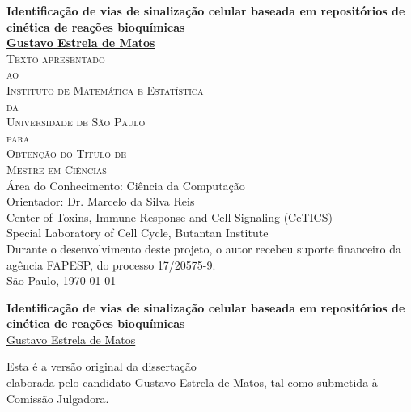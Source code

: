 \documentclass[12pt, twoside]{report}
\numberwithin{mydefinition}{section}
\numberwithin{mytheorem}{section}
\numberwithin{mylemma}{section}
\numberwithin{corollary}{section}
\begin{document}
\thispagestyle{empty}
\begin{center}
{\Large
{\bf Identificação de vias de sinalização celular baseada em
    repositórios de cinética de reações bioquímicas}\\
\bigskip
\bigskip
\bigskip
\bigskip
    {\bf \href{mailto:gustavo.estrela.matos@gmail.com}{Gustavo Estrela de Matos}}\\
\bigskip
\bigskip
\bigskip
\bigskip
\textsc{
    Texto apresentado\\[-0.25cm] 
    ao\\[-0.25cm]
    Instituto de Matemática e Estatística\\[-0.25cm]
    da\\[-0.25cm]
    Universidade de São Paulo\\[-0.25cm]
    para\\[-0.25cm]
    Obtenção do Título de\\
    Mestre em Ciências\\
    }
\bigskip
\bigskip
\bigskip
\bigskip
Área do Conhecimento: Ciência da Computação\\
\bigskip
Orientador: Dr. Marcelo da Silva Reis\\
\bigskip
\bigskip
\bigskip
\bigskip
\bigskip
\bigskip
\bigskip
\bigskip
Center of Toxins, Immune-Response and Cell Signaling (CeTICS)\\
\bigskip
Special Laboratory of Cell Cycle, Butantan Institute\\
\bigskip
\bigskip
{\normalsize Durante o desenvolvimento deste projeto, o autor recebeu
    suporte financeiro da agência FAPESP, do processo 17/20575-9.}\\
\bigskip
\bigskip
\bigskip
São Paulo, \today
}
\end{center}
\newpage


\thispagestyle{empty}
\begin{center}
{\Large
{\bf Identificação de vias de sinalização celular baseada em
    repositórios de cinética de reações bioquímicas}\\
\bigskip
\bigskip
\bigskip
\bigskip
\bigskip
\bigskip
\bigskip
\bigskip
\bigskip
    {\href{mailto:gustavo.estrela.matos@gmail.com}{Gustavo Estrela de Matos}}\\
\bigskip
\bigskip
\bigskip
\bigskip
\bigskip
\bigskip
\bigskip
\bigskip
\bigskip
\bigskip
\bigskip
\bigskip
\bigskip
\bigskip
\bigskip
\hfill
\begin{minipage}{15em}
{\small Esta é a versão original da dissertação\\
elaborada pelo candidato Gustavo Estrela de Matos,
tal como submetida à Comissão Julgadora.}
\end{minipage}
\bigskip
\bigskip
}
\end{center}
\newpage
\end{document}
